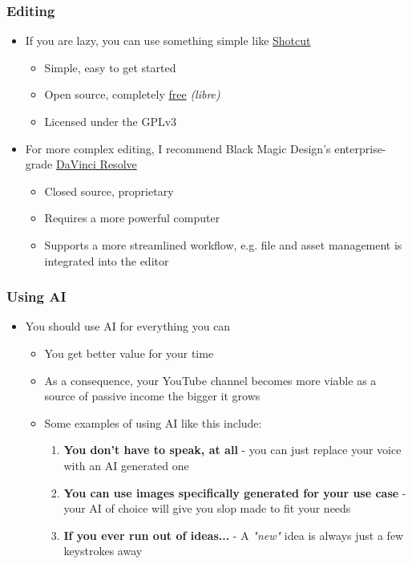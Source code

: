 \documentclass{beamer}
\begin{document}
\begin{frame}
	\frametitle{Editing}

	\begin{itemize}
		\item If you are lazy, you can use something simple like \href{https://shotcut.org}{Shotcut}
		      \begin{itemize}
			      \item Simple, easy to get started
			      \item Open source, completely
			            \href{https://www.gnu.org/philosophy/free-sw.html}{free} \textit{(libre)}
			      \item Licensed under the GPLv3
		      \end{itemize}
		\item For more complex editing, I recommend Black Magic Design's enterprise-grade
		      \href{https://www.blackmagicdesign.com/products/davinciresolve}{DaVinci Resolve}
		      \begin{itemize}
			      \item Closed source, proprietary
			      \item Requires a more powerful computer
			      \item Supports a more streamlined workflow, e.g. file and asset management is
			            integrated into the editor
		      \end{itemize}
	\end{itemize}
\end{frame}

\begin{frame}
	\frametitle{Using AI}

	\begin{itemize}
		\item You should use AI for everything you can
		      \begin{itemize}
			      \item You get better value for your time
			      \item As a consequence, your YouTube channel becomes more viable as a source of
			            passive income the bigger it grows
			      \item Some examples of using AI like this include:
			            \begin{enumerate}
				            \item \textbf{You don't have to speak, at all} - you can just replace your
				                  voice with an AI generated one
				            \item \textbf{You can use images specifically generated for your use
					                  case} - your AI of choice will give you slop made to fit your needs
				            \item \textbf{If you ever run out of ideas...} - A \textit{"new"}
				                  idea is always just a few keystrokes away
			            \end{enumerate}
		      \end{itemize}
	\end{itemize}
\end{frame}
\end{document}
